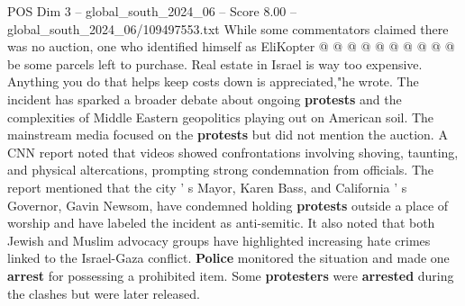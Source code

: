 \begin{textsample}{POS Dim 3 – global\_south\_2024\_06 – Score 8.00 – global\_south\_2024\_06/109497553.txt}
While some commentators claimed there was no auction, one who identified himself as EliKopter @ @ @ @ @ @ @ @ @ @ be some parcels left to purchase.
Real estate in Israel is way too expensive.
Anything you do that helps keep costs down is appreciated,"he wrote.
The incident has sparked a broader debate about ongoing \textbf{protests} and the complexities of Middle Eastern geopolitics playing out on American soil.
The mainstream media focused on the \textbf{protests} but did not mention the auction.
A CNN report noted that videos showed confrontations involving shoving, taunting, and physical altercations, prompting strong condemnation from officials.
The report mentioned that the city ' s Mayor, Karen Bass, and California ' s Governor, Gavin Newsom, have condemned holding \textbf{protests} outside a place of worship and have labeled the incident as anti-semitic.
It also noted that both Jewish and Muslim advocacy groups have highlighted increasing hate crimes linked to the Israel-Gaza conflict. \textbf{Police} monitored the situation and made one \textbf{arrest} for possessing a prohibited item.
Some \textbf{protesters} were \textbf{arrested} during the clashes but were later released.

\end{textsample}
